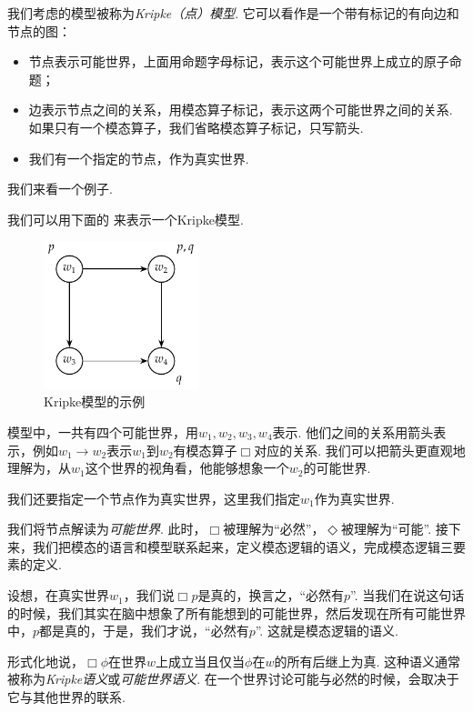 我们考虑的模型被称为\textit{Kripke（点）模型}. 它可以看作是一个带有标记的有向边和节点的图：
\begin{itemize}
\item 节点表示可能世界，上面用命题字母标记，表示这个可能世界上成立的原子命题；
\item 边表示节点之间的关系，用模态算子标记，表示这两个可能世界之间的关系. 如果只有一个模态算子，我们省略模态算子标记，只写箭头. 
\item 我们有一个指定的节点，作为真实世界. 
\end{itemize}

我们来看一个例子. 

\begin{example}
我们可以用下面的 来表示一个Kripke模型. 

\begin{figure}[ht]
\centering
\includegraphics[width=0.4\textwidth]{figures/modal-logic/Kripke-model-basic.pdf}
\caption{Kripke模型的示例}\label{fig:kripke-model-basic}
\end{figure}

模型中，一共有四个可能世界，用$w_1,w_2,w_3,w_4$表示. 他们之间的关系用箭头表示，例如$w_1\to w_2$表示$w_1$到$w_2$有模态算子$\Box$对应的关系. 我们可以把箭头更直观地理解为，从$w_1$这个世界的视角看，他能够想象一个$w_2$的可能世界. 

我们还要指定一个节点作为真实世界，这里我们指定$w_1$作为真实世界. 
\end{example}

我们将节点解读为\textit{可能世界}. 此时，$\Box$被理解为“必然”，$\Diamond$被理解为“可能”. 接下来，我们把模态的语言和模型联系起来，定义模态逻辑的语义，完成模态逻辑三要素的定义. 

设想，在真实世界$w_1$，我们说$\Box p$是真的，换言之，“必然有$p$”. 当我们在说这句话的时候，我们其实在脑中想象了所有能想到的可能世界，然后发现在所有可能世界中，$p$都是真的，于是，我们才说，“必然有$p$”. 这就是模态逻辑的语义. 

形式化地说，$\Box\phi$在世界$w$上成立当且仅当$\phi$在$w$的所有后继上为真. 这种语义通常被称为\textit{Kripke语义}或\textit{可能世界语义}. 在一个世界讨论可能与必然的时候，会取决于它与其他世界的联系. 

